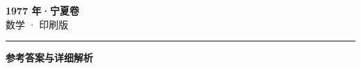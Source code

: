 \documentclass[zihao=5, a4paper]{ctexart}
\begin{document}
\begin{center}
  {\Large\bfseries 1977 年·宁夏卷}\\[4pt]
  {\large 数学 · 印刷版}
\end{center}
\medskip
{}

\par\bigskip\hrule\bigskip
{}
\begin{center}{\large\bfseries 参考答案与详细解析}\end{center}
\smallskip

\end{document}
